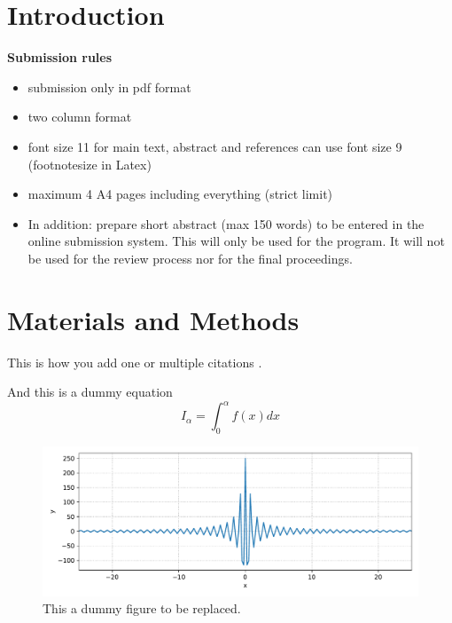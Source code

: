 \section{Introduction}

\textbf{\color{red}Submission rules}
\begin{itemize}
\color{red}
\item submission only in pdf format
\item two column format
\item font size 11 for main text, abstract and references can use font size 9 (footnotesize in Latex)
\item maximum 4 A4 pages including everything (strict limit)
\item In addition: prepare short abstract (max 150 words) to be entered in the online submission system. 
      This will only be used for the program. 
      It will not be used for the review process nor for the final proceedings.
\end{itemize}

\lipsum[2-5]


\section{Materials and Methods}

This is how you add one \cite{Pivot2023} or multiple citations \cite{Saporta2022,Robert2022}.

And this is a dummy equation
\begin{equation}
I_\alpha = \int_0^\alpha f(x) dx
\end{equation}

\begin{figure}
  \centering
  \includegraphics[width=1.0\textwidth]{./fig1.pdf}
  \caption{This a dummy figure to be replaced.}
  \label{fig:dummyfigure}
\end{figure}

